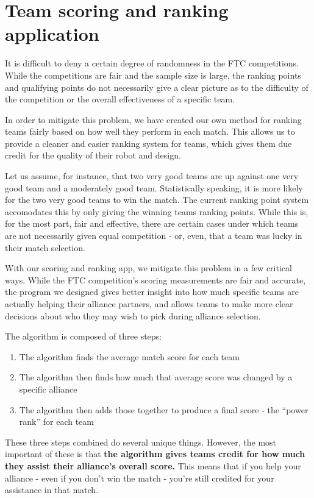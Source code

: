 \section{Team scoring and ranking application}

It is difficult to deny a certain degree of randomness in the FTC competitions. While the competitions are fair and the sample size is large, the ranking points and qualifying points do not necessarily give a clear picture as to the difficulty of the competition or the overall effectiveness of a specific team.

In order to mitigate this problem, we have created our own method for ranking teams fairly based on how well they perform in each match. This allows us to provide a cleaner and easier ranking system for teams, which gives them due credit for the quality of their robot and design.

Let us assume, for instance, that two very good teams are up against one very good team and a moderately good team. Statistically speaking, it is more likely for the two very good teams to win the match. The current ranking point system accomodates this by only giving the winning teams ranking points. While this is, for the most part, fair and effective, there are certain cases under which teams are not necessarily given equal competition - or, even, that a team was lucky in their match selection. 

With our scoring and ranking app, we mitigate this problem in a few critical ways. While the FTC competition's scoring measurements are fair and accurate, the program we designed gives better insight into how much specific teams are actually helping their alliance partners, and allows teams to make more clear decisions about who they may wish to pick during alliance selection. 

The algorithm is composed of three steps:

\begin{enumerate}
\item The algorithm finds the average match score for each team
\item The algorithm then finds how much that average score was changed by a specific alliance
\item The algorithm then adds those together to produce a final score - the ``power rank'' for each team
\end{enumerate}

These three steps combined do several unique things. However, the most important of these is that \textbf{the algorithm gives teams credit for how much they assist their alliance's overall score.} This means that if you help your alliance - even if you don't win the match - you're still credited for your assistance in that match. 

